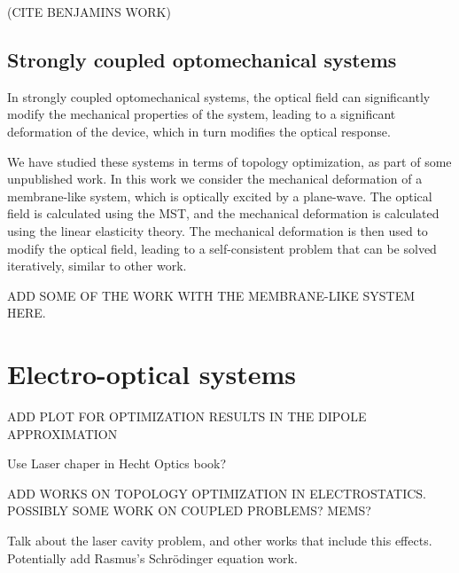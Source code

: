 (CITE BENJAMINS WORK)

\subsection*{Strongly coupled optomechanical systems}

In strongly coupled optomechanical systems, the optical field can significantly modify the mechanical properties of the system, leading to a significant deformation
of the device, which in turn modifies the optical response. 

We have studied these systems in terms of topology optimization, as part of some unpublished work. In this work we consider 
the mechanical deformation of a membrane-like system, which is optically excited by a plane-wave. The optical field is calculated using the MST,
and the mechanical deformation is calculated using the linear elasticity theory. The mechanical deformation is then used to modify the optical field, 
leading to a self-consistent problem that can be solved iteratively, similar to other work.

ADD SOME OF THE WORK WITH THE MEMBRANE-LIKE SYSTEM HERE.


\section{Electro-optical systems~\cite{ownpub4}}

ADD PLOT FOR OPTIMIZATION RESULTS IN THE DIPOLE APPROXIMATION

Use Laser chaper in Hecht Optics book?



ADD WORKS ON TOPOLOGY OPTIMIZATION IN ELECTROSTATICS. POSSIBLY SOME WORK
ON COUPLED PROBLEMS? MEMS?

Talk about the laser cavity problem, and other works that include this effects.
Potentially add Rasmus's Schrödinger equation work.


